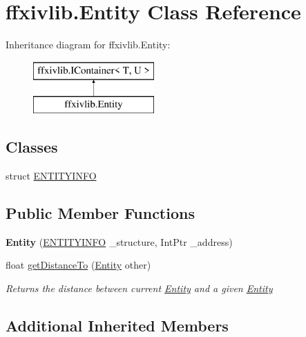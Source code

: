 \hypertarget{classffxivlib_1_1_entity}{\section{ffxivlib.\-Entity Class Reference}
\label{classffxivlib_1_1_entity}
}
Inheritance diagram for ffxivlib.\-Entity\-:\begin{figure}[H]
\begin{center}
\leavevmode
\includegraphics[height=2.000000cm]{classffxivlib_1_1_entity}
\end{center}
\end{figure}
\subsection*{Classes}
\begin{DoxyCompactItemize}
\item 
struct \hyperlink{structffxivlib_1_1_entity_1_1_e_n_t_i_t_y_i_n_f_o}{E\-N\-T\-I\-T\-Y\-I\-N\-F\-O}
\end{DoxyCompactItemize}
\subsection*{Public Member Functions}
\begin{DoxyCompactItemize}
\item 
\hypertarget{classffxivlib_1_1_entity_ad8f9917fb98bf79a98427972aae4a0f5}{{\bfseries Entity} (\hyperlink{structffxivlib_1_1_entity_1_1_e_n_t_i_t_y_i_n_f_o}{E\-N\-T\-I\-T\-Y\-I\-N\-F\-O} \-\_\-structure, Int\-Ptr \-\_\-address)}\label{classffxivlib_1_1_entity_ad8f9917fb98bf79a98427972aae4a0f5}

\item 
float \hyperlink{classffxivlib_1_1_entity_ab8a6be98a59610b3ed8f8fb2cb653424}{get\-Distance\-To} (\hyperlink{classffxivlib_1_1_entity}{Entity} other)
\begin{DoxyCompactList}\small\item\em Returns the distance between current \hyperlink{classffxivlib_1_1_entity}{Entity} and a given \hyperlink{classffxivlib_1_1_entity}{Entity} \end{DoxyCompactList}\end{DoxyCompactItemize}
\subsection*{Additional Inherited Members}


